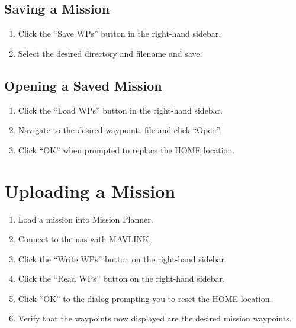 \documentclass{report}
\begin{document}
		\subsection{Saving a Mission}
			\begin{enumerate}
				\item Click the ``Save WPs'' button in the right-hand sidebar.
				\item Select the desired directory and filename and save.
			\end{enumerate}
		\subsection{Opening a Saved Mission}
			\begin{enumerate}
				\item Click the ``Load WPs'' button in the right-hand sidebar.
				\item Navigate to the desired waypoints file and click ``Open''.
				\item Click ``OK'' when prompted to replace the HOME location.
			\end{enumerate}
	\section{Uploading a Mission}
		\begin{enumerate}
			\item Load a mission into Mission Planner.
			\item Connect to the \gls{uas} with MAVLINK.
			\item Click the ``Write WPs'' button on the right-hand sidebar.
			\item Click the ``Read WPs'' button on the right-hand sidebar.
			\item Click ``OK'' to the dialog prompting you to reset the HOME location.
			\item Verify that the waypoints now displayed are the desired mission waypoints.
		\end{enumerate}
\end{document}
